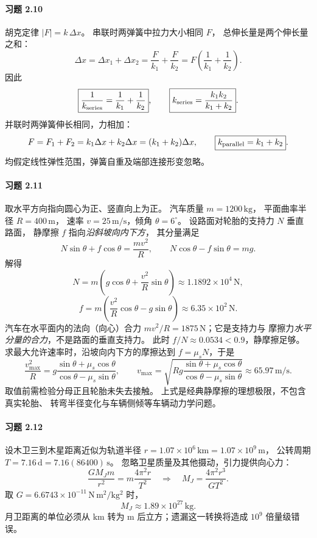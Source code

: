 \paragraph{习题 2.10}
胡克定律 \(|F|=k\,\Delta x\)。
串联时两弹簧中拉力大小相同 \(F\)，
总伸长量是两个伸长量之和：
\[
 \Delta x=\Delta x_1+\Delta x_2
 =\frac F{k_1}+\frac F{k_2}
 =F\left(\frac1{k_1}+\frac1{k_2}\right).
\]
因此
\[
 \boxed{\frac1{k_{\rm series}}=\frac1{k_1}+\frac1{k_2}},
 \qquad
 \boxed{k_{\rm series}=\frac{k_1k_2}{k_1+k_2}}.
\]
并联时两弹簧伸长相同，力相加：
\[
 F=F_1+F_2=k_1\Delta x+k_2\Delta x
 =(k_1+k_2)\Delta x,
 \qquad
 \boxed{k_{\rm parallel}=k_1+k_2}.
\]
均假定线性弹性范围，弹簧自重及端部连接形变忽略。

\paragraph{习题 2.11}
取水平方向指向圆心为正、竖直向上为正。
汽车质量 \(m=1200\,\mathrm{kg}\)，
平面曲率半径 \(R=400\,\mathrm m\)，
速率 \(v=25\,\mathrm{m/s}\)，倾角
\(\theta=6^\circ\)。
设路面对轮胎的支持力 \(N\) 垂直路面，
静摩擦 \(f\) 指向\emph{沿斜坡向内下方}，
其分量满足
\[
 N\sin\theta+f\cos\theta=\frac{mv^2}{R},\qquad
 N\cos\theta-f\sin\theta=mg.
\]
解得
\[
 \boxed{N=m\left(g\cos\theta+\frac{v^2}{R}\sin\theta\right)}
 \approx1.1892\times10^4\,\mathrm N,
\]
\[
 \boxed{f=m\left(\frac{v^2}{R}\cos\theta-g\sin\theta\right)}
 \approx6.35\times10^2\,\mathrm N.
\]
汽车在水平面内的法向（向心）合力
\(mv^2/R=1875\,\mathrm N\)；它是支持力与
摩擦力\emph{水平分量的合力}，不是路面的垂直支持力。
此时 \(f/N\approx0.0534<0.9\)，静摩擦足够。
求最大允许速率时，沿坡向内下方的摩擦达到
\(f=\mu_sN\)，于是
\[
 \frac{v_{\max}^2}{R}
 =g\frac{\sin\theta+\mu_s\cos\theta}
 {\cos\theta-\mu_s\sin\theta},
 \qquad
 \boxed{v_{\max}
 =\sqrt{Rg\frac{\sin\theta+\mu_s\cos\theta}
 {\cos\theta-\mu_s\sin\theta}}}
 \approx65.97\,\mathrm{m/s}.
\]
取值前需检验分母正且轮胎未失去接触。
上式是经典静摩擦的理想极限，不包含真实轮胎、
转弯半径变化与车辆侧倾等车辆动力学问题。

\paragraph{习题 2.12}
设木卫三到木星距离近似为轨道半径
\(r=1.07\times10^6\,\mathrm{km}
=1.07\times10^9\,\mathrm m\)，
公转周期
\(T=7.16\,\mathrm d=7.16(86400)\,\mathrm s\)。
忽略卫星质量及其他摄动，引力提供向心力：
\[
 \frac{GM_Jm}{r^2}
 =m\frac{4\pi^2r}{T^2}
 \quad\Longrightarrow\quad
 \boxed{M_J=\frac{4\pi^2r^3}{GT^2}}.
\]
取 \(G=6.6743\times10^{-11}\,
\mathrm{N\,m^2/kg^2}\) 时，
\[
 \boxed{M_J\approx1.89\times10^{27}\,\mathrm{kg}}.
\]
月卫距离的单位必须从 \(\mathrm{km}\) 转为
\(\mathrm m\) 后立方；遗漏这一转换将造成
\(10^9\) 倍量级错误。


